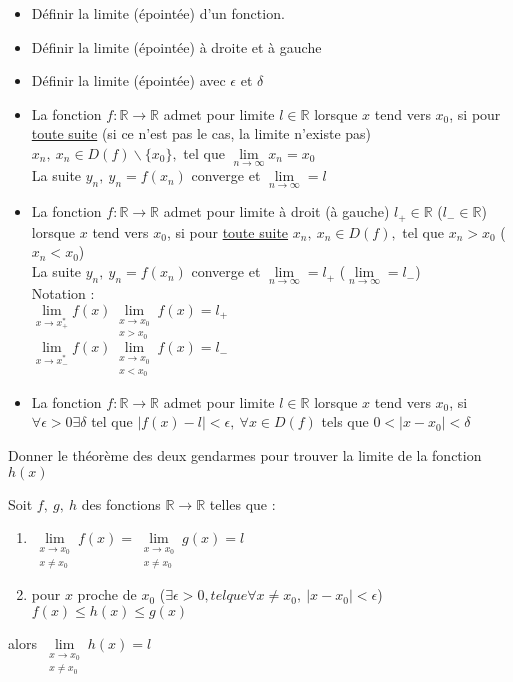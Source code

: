 \documentclass[12pt]{article}
\newcommand*{\xfield}[1]{\begin{mdframed}\centering #1\end{mdframed}\bigskip}
\newenvironment{note}{}{}
\begin{document}
\begin{note}
	\xfield{\begin{itemize}
	\item Définir la limite (épointée) d'un fonction.
	\item Définir la limite (épointée) à droite et à gauche
	\item Définir la limite (épointée) avec $\epsilon$ et $\delta$
	\end{itemize} }
	\xfield{\begin{itemize}
	\item La fonction $f : \mathbb{R} \rightarrow \mathbb{R}$ admet pour limite $l \in \mathbb{R}$ lorsque $x$ tend vers $x_0$, si pour \underline{toute suite} (si ce n'est pas le cas, la limite n'existe pas) $x_n,\ x_n \in D(f) \smallsetminus \{x_0\},$ tel que $\lim\limits_{n \to \infty}x_n = x_0$ \\
	La suite $y_n,\ y_n = f(x_n)$ converge et $\lim\limits_{n \to \infty} = l$
	\item La fonction $f : \mathbb{R} \rightarrow \mathbb{R}$ admet pour limite à droit (à gauche) $l_+ \in \mathbb{R}$ ($l_- \in \mathbb{R}$) lorsque $x$ tend vers $x_0$, si pour \underline{toute suite} $x_n,\ x_n \in D(f),$ tel que $x_n > x_0$ ($x_n < x_0$) \\
	La suite $y_n,\ y_n = f(x_n)$ converge et $\lim\limits_{n \to \infty} = l_+$ ($\lim\limits_{n \to \infty} = l_-$)\\
	Notation :\\
	$\lim\limits_{x \to x_+^*}f(x)\lim\limits_{\substack{x \to x_0 \\ x > x_0}}f(x) = l_+$\\
	$\lim\limits_{x \to x_-^*}f(x)\lim\limits_{\substack{x \to x_0 \\ x < x_0}}f(x) = l_-$
	\item La fonction $f : \mathbb{R} \rightarrow \mathbb{R}$ admet pour limite $l \in \mathbb{R}$ lorsque $x$ tend vers $x_0$, si $\forall \epsilon > 0 \exists \delta$ tel que $|f(x) -l| < \epsilon,\ \forall x \in D(f)$ tels que $0< |x-x_0| < \delta$
	\end{itemize} }
\end{note}

\begin{note}
	\xfield{Donner le théorème des deux gendarmes pour trouver la limite de la fonction $h(x)$}
	\xfield{Soit $f,\ g,\ h$ des fonctions $\mathbb{R} \to \mathbb{R}$ telles que :
	\begin{enumerate}
		\item $\lim\limits_{\substack{x\to x_0\\x \neq x_0}}f(x) = \lim\limits_{\substack{x\to x_0\\x \neq x_0}}g(x) = l$
		\item pour $x$ proche de $x_0$ ($\exists \epsilon > 0, tel que \forall x \neq x_0,\ |x-x_0| < \epsilon$)\\
		$f(x) \le h(x) \le g(x)$
	\end{enumerate}
	alors  $\lim\limits_{\substack{x\to x_0\\x \neq x_0}}h(x) = l$}
\end{note}
\end{document}
